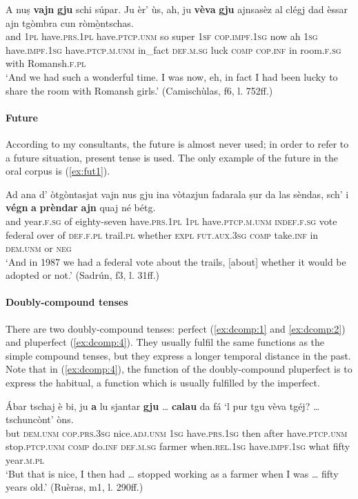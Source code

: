 \ea
\label{ex:plupf3}
\gll   A nuṣ \textbf{vajn} \textbf{gju} schi súpar. Ju èr' ùs, ah, ju \textbf{vèva} \textbf{gju} ajnsasèz al clégj dad èssar ajn tgòmbra cun ròmò̱ntschas.\\
and \textsc{1pl} have.\textsc{prs.1pl} have.\textsc{ptcp.unm} so super \textsc{1sf} \textsc{cop.impf.1sg} now ah \textsc{1sg} have.\textsc{impf.1sg} have.\textsc{ptcp.m.unm} in\_fact \textsc{def.m.sg} luck \textsc{comp} \textsc{cop.inf} in room.\textsc{f.sg} with Romansh.\textsc{f.pl}\\
\glt `And we had such a wonderful time. I was now, eh, in fact I had been lucky to share the room with Romansh girls.' (Camischùlas, f6, l. 752ff.)
\z

\paragraph{Future}
According to my consultants, the future is almost never used; in order to refer to a future situation, present tense is used. The only example of the future in the oral corpus is (\ref{ex:fut1}).

\ea\label{ex:fut1}
\gll Ad ana d' òtgòntasjat vajn nus gju ina vòtazjun fadarala ṣur da las sèndas, sch' i \textbf{végn} \textbf{a} \textbf{prèndar} \textbf{ajn} quaj né bétg.   \\
and year.\textsc{f.sg} of eighty-seven have.\textsc{prs.1pl} \textsc{1pl} have.\textsc{ptcp.m.unm} \textsc{indef.f.sg} vote federal over of \textsc{def.f.pl} trail.\textsc{pl} whether \textsc{expl} \textsc{fut.aux.3sg} \textsc{comp} take.\textsc{inf} in \textsc{dem.unm} or \textsc{neg}  \\
\glt `And in 1987 we had a federal vote about the trails, [about] whether it would be adopted or not.' (Sadrún, f3, l. 31ff.)
\z

\paragraph{Doubly-compound tenses}
There are two doubly-compound tenses: perfect (\ref{ex:dcomp:1} and \ref{ex:dcomp:2}) and pluperfect (\ref{ex:dcomp:4}). They usually fulfil the same functions as the simple compound tenses, but they express a longer temporal distance in the past. Note that in (\ref{ex:dcomp:4}), the function of the doubly-compound pluperfect is to express the habitual, a function which is usually fulfilled by the imperfect.

\ea
\label{ex:dcomp:1}
\gll    Ábar tschaj è bi, ju \textbf{a} lu sjantar \textbf{gju} … \textbf{calau} da fá `l pur tgu vèva tgéj? … tschuncònt’ òns.\\
but \textsc{dem.unm} \textsc{cop.prs.3sg} nice.\textsc{adj.unm} \textsc{1sg} have.\textsc{prs.1sg} then after have.\textsc{ptcp.unm} {} stop.\textsc{ptcp.unm} \textsc{comp} do.\textsc{inf} \textsc{def.m.sg} farmer when.\textsc{rel.1sg} have.\textsc{impf.1sg} what {} fifty year.\textsc{m.pl}\\
\glt `But that is nice, I then had … stopped working as a farmer when I was … fifty years old.' (Ruèras, m1, l. 290ff.)
\z

